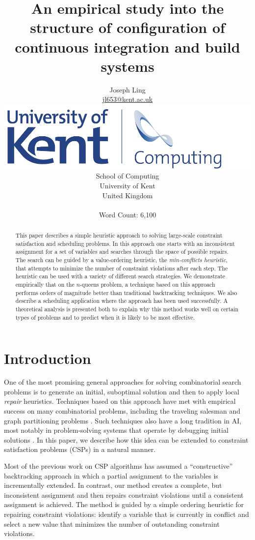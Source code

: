 \documentclass[twoside,12pt,titlepage,a4paper]{article}
\title{An empirical study into the structure of configuration of continuous integration and build systems}
\author{Joseph Ling\\\vspace{10mm}
       \url{jl653@kent.ac.uk} \\ \vspace{5mm}
       \includegraphics[scale=0.6]{Kent_Comp_294_RGB} \\
       School of Computing \\
       University of Kent \\
       United Kingdom \\ \vspace{10mm} \\ Word Count: 6,100}
\begin{document}
\maketitle
\restoregeometry              %

\begin{abstract}
This paper describes a simple heuristic approach to solving large-scale
constraint satisfaction and scheduling problems.  In this approach one
starts with an inconsistent assignment for a set of variables and
searches through the space of possible repairs. The search can be guided
by a value-ordering heuristic, the {\em min-conflicts heuristic}, that
attempts to minimize the number of constraint violations after each
step.  The heuristic can be used with a variety of different search
strategies.  We demonstrate empirically that on the $n$-queens problem, 
a technique
based on this approach performs orders of magnitude better than
traditional backtracking techniques.  We also describe a
scheduling application where the approach has been used successfully.  A
theoretical analysis is presented both to explain why this method works
well on certain types of problems and to predict when it is likely to
be most effective.
\end{abstract}

\section{Introduction}
\label{Introduction}

  One of the most promising general approaches for solving combinatorial search
problems is to generate an initial, suboptimal solution and then to apply
local {\em repair} 
heuristics.
Techniques based on
this approach have met with empirical success on many combinatorial 
problems, including
the traveling salesman and graph partitioning problems \cite{papad}.  
Such techniques also have a long tradition in AI, most notably in
problem-solving systems that operate by debugging initial
solutions \cite{simmons-aaai88,hacker}.
In this paper, we describe how this idea can be extended to
constraint satisfaction problems (CSPs) in a natural manner.

Most of the previous work on CSP algorithms has assumed a
``constructive'' backtracking approach in which a partial assignment
to the variables is incrementally extended. In contrast, our 
method \cite{min-aaai} creates a complete, but inconsistent assignment and
then repairs constraint violations until a consistent assignment is
achieved.  The method is guided by a simple ordering heuristic for
repairing constraint violations: identify a variable that is currently
in conflict and select a new value that minimizes the number of
outstanding constraint violations.
\end{document}
